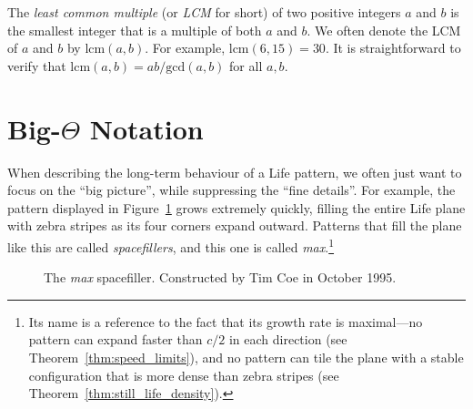The \emph{least common multiple} (or \emph{LCM} for short) of two positive integers $a$ and $b$ is the smallest integer that is a multiple of both $a$ and $b$. We often denote the LCM of $a$ and $b$ by $\mathrm{lcm}(a,b)$. For example, $\mathrm{lcm}(6,15) = 30$. It is straightforward to verify that $\mathrm{lcm}(a,b) = ab/\mathrm{gcd}(a,b)$ for all $a,b$.



\section{Big-$\Theta$ Notation}\label{sec:bigO}

When describing the long-term behaviour of a Life pattern, we often just want to focus on the ``big picture'', while suppressing the ``fine details''. For example, the pattern displayed in Figure~\ref{fig:max} grows extremely quickly, filling the entire Life plane with zebra stripes as its four corners expand outward. Patterns that fill the plane like this are called \emph{spacefillers}, and this one is called \emph{max}.\footnote{Its name is a reference to the fact that its growth rate is maximal---no pattern can expand faster than $c/2$ in each direction (see Theorem~\ref{thm:speed_limits}), and no pattern can tile the plane with a stable configuration that is more dense than zebra stripes (see Theorem~\ref{thm:still_life_density}).}

\begin{figure}[!htb]
	\centering
	\caption{The \emph{max} spacefiller. Constructed by Tim Coe in October 1995.}\label{fig:max}
\end{figure}

